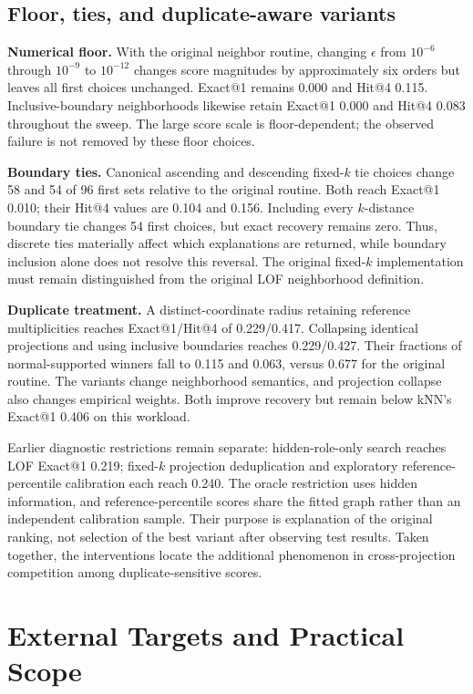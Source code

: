 \documentclass[conference]{IEEEtran}
\begin{document}
\subsection{Floor, ties, and duplicate-aware variants}
\textbf{Numerical floor.} With the original neighbor routine, changing $\epsilon$ from $10^{-6}$ through $10^{-9}$ to $10^{-12}$ changes score magnitudes by approximately six orders but leaves all first choices unchanged. Exact@1 remains 0.000 and Hit@4 0.115. Inclusive-boundary neighborhoods likewise retain Exact@1 0.000 and Hit@4 0.083 throughout the sweep. The large score scale is floor-dependent; the observed failure is not removed by these floor choices.

\textbf{Boundary ties.} Canonical ascending and descending fixed-$k$ tie choices change 58 and 54 of 96 first sets relative to the original routine. Both reach Exact@1 0.010; their Hit@4 values are 0.104 and 0.156. Including every $k$-distance boundary tie changes 54 first choices, but exact recovery remains zero. Thus, discrete ties materially affect which explanations are returned, while boundary inclusion alone does not resolve this reversal. The original fixed-$k$ implementation must remain distinguished from the original LOF neighborhood definition.

\textbf{Duplicate treatment.} A distinct-coordinate radius retaining reference multiplicities reaches Exact@1/Hit@4 of 0.229/0.417. Collapsing identical projections and using inclusive boundaries reaches 0.229/0.427. Their fractions of normal-supported winners fall to 0.115 and 0.063, versus 0.677 for the original routine. The variants change neighborhood semantics, and projection collapse also changes empirical weights. Both improve recovery but remain below kNN's Exact@1 0.406 on this workload.

Earlier diagnostic restrictions remain separate: hidden-role-only search reaches LOF Exact@1 0.219; fixed-$k$ projection deduplication and exploratory reference-percentile calibration each reach 0.240. The oracle restriction uses hidden information, and reference-percentile scores share the fitted graph rather than an independent calibration sample. Their purpose is explanation of the original ranking, not selection of the best variant after observing test results. Taken together, the interventions locate the additional phenomenon in cross-projection competition among duplicate-sensitive scores.

\section{External Targets and Practical Scope}
\end{document}
